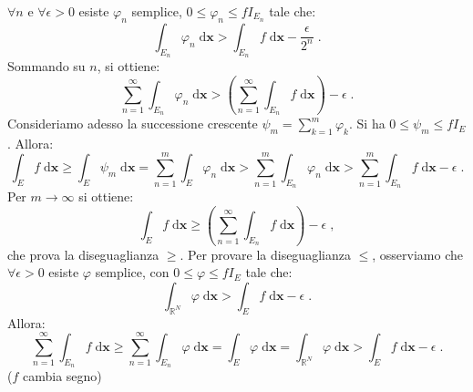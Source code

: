 \documentclass[a4paper,12pt]{report}
\theoremstyle{plain}
\theoremstyle{definition}
\theoremstyle{remark}
\newcommand{\diff}[1]{\mathrm{d}#1}
\numberwithin{equation}{section}
\begin{document}
$\forall n$ e $\forall \epsilon>0$ esiste $\varphi_n$ semplice, $0\le\varphi_n\le fI_{E_n}$ tale che:
\begin{equation}
\int_{E_n} \varphi_n\;\diff{\mathbf{x}}>\int_{E_n} f\;\diff{\mathbf{x}} - \frac{\epsilon}{2^n}\;.
\end{equation}
Sommando su $n$, si ottiene:
\begin{equation}
\sum_{n=1}^{\infty} \int_{E_n}\varphi_n\;\diff{\mathbf{x}}>\left(\sum_{n=1}^{\infty}\int_{E_n} f\;\diff{\mathbf{x}}\right)-\epsilon\;.
\end{equation}
Consideriamo adesso la successione crescente $\psi_m=\sum_{k=1}^m \varphi_k$. Si ha $0\le \psi_m\le fI_E$. Allora:
\begin{equation}
\int_E f\;\diff{\mathbf{x}}\ge \int_E \psi_m\;\diff{\mathbf{x}}=\sum_{n=1}^m \int_E \varphi_n\;\diff{\mathbf{x}}>\sum_{n=1}^m\int_{E_n} \varphi_n\;\diff{\mathbf{x}}>\sum_{n=1}^m\int_{E_n}f\;\diff{\mathbf{x}}-\epsilon\;.
\end{equation}
Per $m\to\infty$ si ottiene:
\begin{equation}
\int_E f\;\diff{\mathbf{x}}\ge \left(\sum_{n=1}^{\infty}\int_{E_n} f\;\diff{\mathbf{x}}\right)-\epsilon\;,
\end{equation}
che prova la diseguaglianza $\ge$. Per provare la diseguaglianza $\le$, osserviamo che $\forall \epsilon>0$ esiste $\varphi$ semplice, con
 $0\le \varphi\le fI_E$ tale che:
\begin{equation}
\int_{\mathbb{R}^N} \varphi\;\diff{\mathbf{x}}>\int_E f\;\diff{\mathbf{x}}-\epsilon\;.
\end{equation}
Allora:
\begin{equation}
\sum_{n=1}^{\infty}\int_{E_n} f\;\diff{\mathbf{x}}\ge \sum_{n=1}^{\infty} \int_{E_n}\varphi\;\diff{\mathbf{x}}=\int_E \varphi\;\diff{\mathbf{x}}=\int_{\mathbb{R}^N}\varphi\;\diff{\mathbf{x}}>\int_E f\;\diff{\mathbf{x}}-\epsilon\;.
\end{equation}
\endproof
\proof ($f$ cambia segno) \\
\end{document}
